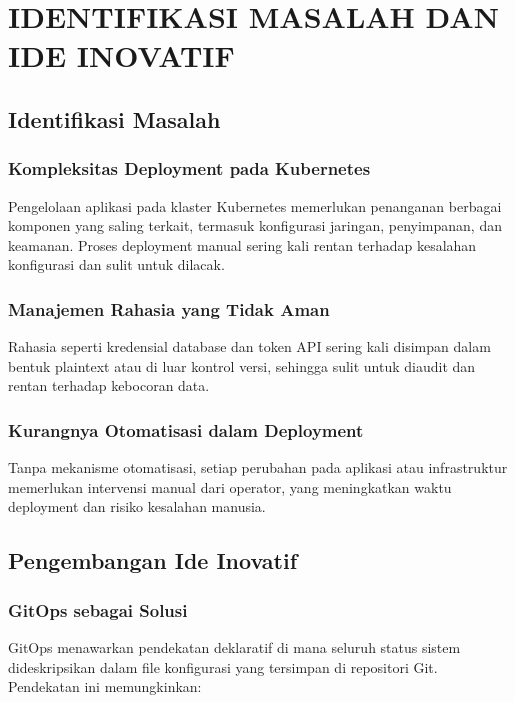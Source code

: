 \chapter{IDENTIFIKASI MASALAH DAN IDE INOVATIF}

\section{Identifikasi Masalah}

\subsection{Kompleksitas Deployment pada Kubernetes}

Pengelolaan aplikasi pada klaster Kubernetes memerlukan penanganan berbagai komponen yang saling terkait, termasuk konfigurasi jaringan, penyimpanan, dan keamanan. Proses deployment manual sering kali rentan terhadap kesalahan konfigurasi dan sulit untuk dilacak.

\subsection{Manajemen Rahasia yang Tidak Aman}

Rahasia seperti kredensial database dan token API sering kali disimpan dalam bentuk plaintext atau di luar kontrol versi, sehingga sulit untuk diaudit dan rentan terhadap kebocoran data.

\subsection{Kurangnya Otomatisasi dalam Deployment}

Tanpa mekanisme otomatisasi, setiap perubahan pada aplikasi atau infrastruktur memerlukan intervensi manual dari operator, yang meningkatkan waktu deployment dan risiko kesalahan manusia.

\section{Pengembangan Ide Inovatif}

\subsection{GitOps sebagai Solusi}

GitOps menawarkan pendekatan deklaratif di mana seluruh status sistem dideskripsikan dalam file konfigurasi yang tersimpan di repositori Git. Pendekatan ini memungkinkan:

